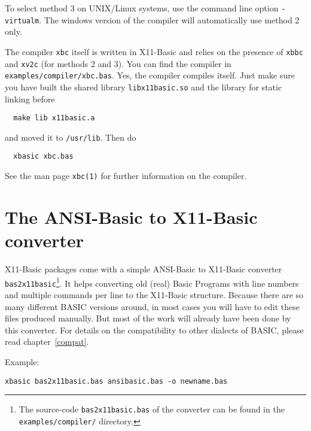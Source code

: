 To select method 3 on UNIX/Linux systems, use the command line option 
\verb|-virtualm|. The windows version of the compiler will automatically use
method 2 only.

The compiler \verb|xbc| itself is written in X11-Basic and relies on the
presence of \verb|xbbc| and \verb|xv2c| (for methods 2 and 3).
You can find the compiler in \verb|examples/compiler/xbc.bas|. 
Yes, the compiler compiles itself. Just make sure you have built the shared 
library \verb|libx11basic.so| and the library for static linking before  
\begin{mdframed}[hidealllines=true,backgroundcolor=black!20]
\begin{verbatim}
  make lib x11basic.a
\end{verbatim}
\end{mdframed}
and moved it to \verb|/usr/lib|. Then do
\begin{mdframed}[hidealllines=true,backgroundcolor=black!20]
\begin{verbatim}
  xbasic xbc.bas
\end{verbatim}
\end{mdframed}
See the man page \verb|xbc(1)| for further information on the compiler.




\section{The ANSI-Basic to X11-Basic converter}

X11-Basic packages come with a simple ANSI-Basic to X11-Basic converter 
\verb|bas2x11basic|\footnote{The source-code {\tt bas2x11basic.bas} of the 
converter can be found in the {\tt examples/compiler/} directory.}.
It helps converting old (real) Basic Programs with line numbers and multiple
commands per line to the X11-Basic structure.  Because there are so many
different BASIC versions around, in most cases you will have to edit these
files produced manually. But most of the work will already  have been done by
this converter. For details on the compatibility to other dialects of BASIC, 
please read chapter~\ref{compat}.

Example:
\begin{mdframed}[hidealllines=true,backgroundcolor=black!20]
\begin{verbatim}
xbasic bas2x11basic.bas ansibasic.bas -o newname.bas
\end{verbatim}
\end{mdframed}

